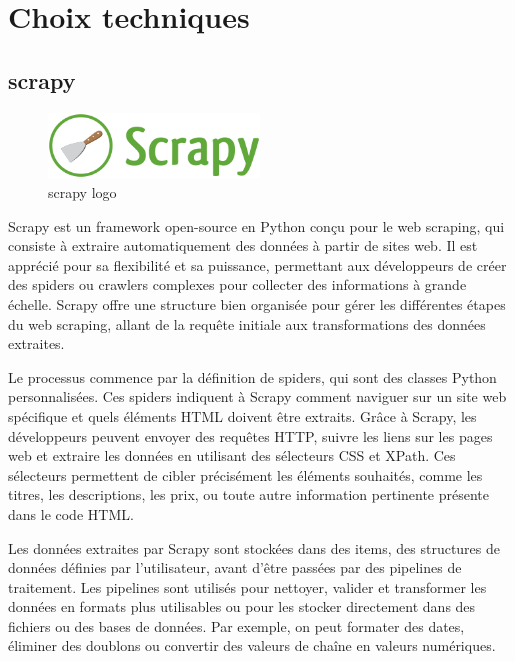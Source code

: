 \documentclass[a4paper,12pt]{report}
\numberwithin{equation}{section}
\begin{document}
\section{Choix techniques}
\subsection{scrapy}
\begin{figure}[H]
    \centering
    \includegraphics[width=0.5\textwidth]{tech/scrapy.png}
    \caption{scrapy logo}
    \label{fig:scrapy logo}
\end{figure}
\par
Scrapy est un framework open-source en Python conçu pour le web scraping, qui consiste à extraire automatiquement des données à partir de sites web. Il est apprécié pour sa flexibilité et sa puissance, permettant aux développeurs de créer des spiders ou crawlers complexes pour collecter des informations à grande échelle. Scrapy offre une structure bien organisée pour gérer les différentes étapes du web scraping, allant de la requête initiale aux transformations des données extraites.\\ \par
Le processus commence par la définition de spiders, qui sont des classes Python personnalisées. Ces spiders indiquent à Scrapy comment naviguer sur un site web spécifique et quels éléments HTML doivent être extraits. Grâce à Scrapy, les développeurs peuvent envoyer des requêtes HTTP, suivre les liens sur les pages web et extraire les données en utilisant des sélecteurs CSS et XPath. Ces sélecteurs permettent de cibler précisément les éléments souhaités, comme les titres, les descriptions, les prix, ou toute autre information pertinente présente dans le code HTML.\\ \par
Les données extraites par Scrapy sont stockées dans des items, des structures de données définies par l'utilisateur, avant d'être passées par des pipelines de traitement. Les pipelines sont utilisés pour nettoyer, valider et transformer les données en formats plus utilisables ou pour les stocker directement dans des fichiers ou des bases de données. Par exemple, on peut formater des dates, éliminer des doublons ou convertir des valeurs de chaîne en valeurs numériques.
\end{document}
